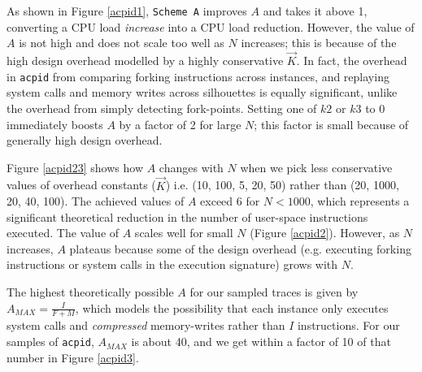 As shown in Figure \ref{acpid1}, \texttt{Scheme A} improves $A$ and
takes it above 1, converting a CPU load {\em increase}
into a CPU load reduction. However, the value of $A$ is not high
and does not scale too well as $N$ increases;
this is because of the high design overhead 
modelled by a highly conservative $\vec K$. In fact, the overhead 
in \texttt{acpid} from comparing forking instructions across instances, and replaying system calls and memory writes
across silhouettes is equally significant, unlike
the overhead from simply detecting fork-points.
Setting one of $k2$ or $k3$ to 0 immediately boosts $A$ by a factor of 2 for large $N$;
this factor is small because of generally high design overhead.

Figure \ref{acpid23} shows how $A$ changes with $N$ when we pick less conservative
values of overhead constants ($\vec K$) i.e. (10, 100, 5, 20, 50) 
rather than (20, 1000, 20, 40, 100). The achieved values of $A$ 
exceed 6 for $N < 1000$, which represents a significant
theoretical reduction in the number of user-space instructions
executed. The value of $A$ scales well for small $N$
(Figure \ref{acpid2}).
However, as $N$ increases, $A$ plateaus because some
of the design overhead (e.g. executing forking instructions or system
calls in the execution signature) grows with $N$. 

The highest theoretically possible
$A$ for our sampled traces is given by $A_{MAX} = \frac{I}{F+M}$,
which models the possibility that each instance only
executes system calls and {\em compressed} memory-writes
rather than $I$ instructions. For our samples of \texttt{acpid}, $A_{MAX}$ 
is about 40, and we get within a factor of 10 of that number in Figure \ref{acpid3}. 

